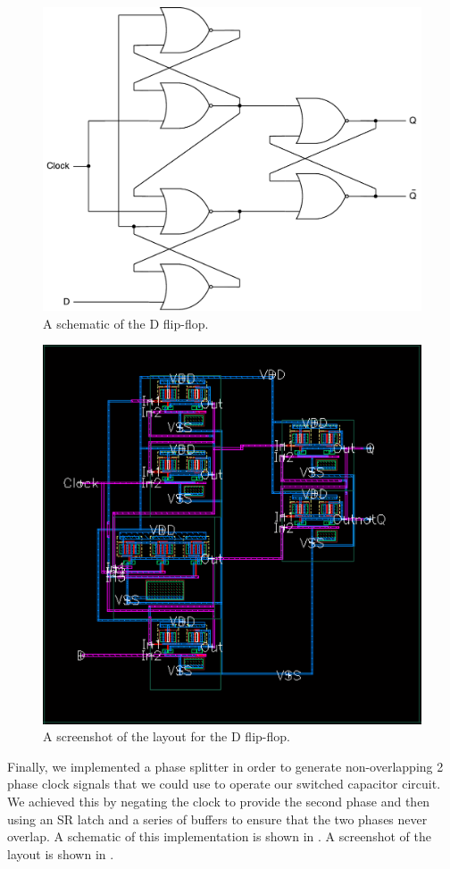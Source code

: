 \documentclass[journal,hidelinks]{IEEEtran}
\begin{document}
\begin{figure}[!htb]
  \centering
  \includegraphics[width=0.8\columnwidth]{diagrams/flip_flop.pdf}
  \caption{A schematic of the D flip-flop.}
  \label{fig:flip_flop}
\end{figure}

\begin{figure}[!htb]
  \centering
  \includegraphics[width=0.8\columnwidth]{layout/flip_flop.png}
  \caption{A screenshot of the layout for the D flip-flop.}
  \label{fig:flip_flop_layout}
\end{figure}

Finally, we implemented a phase splitter in order to generate non-overlapping 2 phase clock signals that we could use to operate our switched capacitor circuit. We achieved this by negating the clock to provide the second phase and then using an SR latch and a series of buffers to ensure that the two phases never overlap. A schematic of this implementation is shown in . A screenshot of the layout is shown in .
\end{document}
